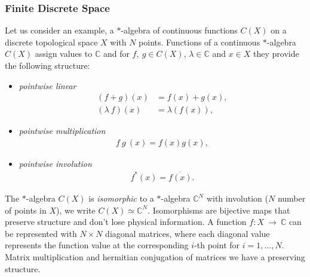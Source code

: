 \subsubsection{Finite Discrete Space}
Let us consider an example, a $*$-algebra of continuous functions $C(X)$
on a discrete topological space $X$ with $N$ points. Functions of a
continuous $*$-algebra $C(X)$ assign values to $\mathbb{C}$ and for $f,\ g \in
C(X)$, $\lambda \in \mathbb{C}$ and $x \in X$ they provide the following structure:
\begin{itemize}
    \item \textit{pointwise linear}
        \begin{align}
            (f + g)(x) &= f(x) + g(x),\\
            (\lambda\ f)(x) &= \lambda (f(x)),
        \end{align}
    \item \textit{pointwise multiplication}
        \begin{align}
        f\ g\ (x) = f(x)g(x),
        \end{align}
    \item \textit{pointwise involution}
        \begin{align}
        f^*(x) = \overline{f(x)}.
        \end{align}
\end{itemize}
The $*$-algebra $C(X)$ is \textit{isomorphic} to a $*$-algebra $\mathbb{C}^N$
with involution ($N$ number of points in $X$), we write $C(X) \simeq
\mathbb{C}^N$.  Isomorphisms are bijective maps that preserve structure and
don't lose physical information.  A function $f:X\ \rightarrow\ \mathbb{C}$
can be represented with $N \times N$ diagonal matrices, where each diagonal
value represents the function value at the corresponding $i$-th point for $i
= 1,...,N$. Matrix multiplication and hermitian conjugation of
matrices we have a preserving structure.

